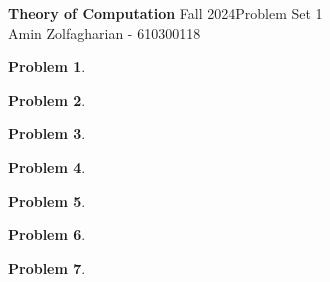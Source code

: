 \documentclass[12pt]{article}
\newcommand{\customanswer}[1]{%
\begin{problem}
\end{problem}

}
\newtheorem{problem}{Problem}
\begin{document}
\noindent \textbf{Theory of Computation} Fall 2024\hfill Problem Set 1\\
Amin Zolfagharian - 610300118

\hrulefill

\customanswer{1}
\customanswer{2}
\newpage
\customanswer{3}
\customanswer{4}
\customanswer{5}
\customanswer{6}
\customanswer{7}
\end{document}
